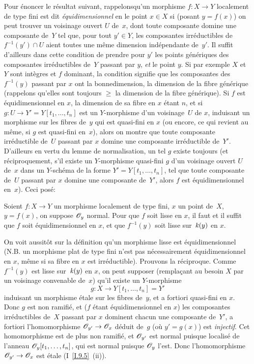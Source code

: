 Pour
\'enoncer le r\'esultat suivant, \og rappelons\fg qu'un morphisme
$f\colon X\to Y$ localement de type fini est dit
\emph{équidimensionnel}
en le point $x\in X$ si (posant $y=f(x)$) on peut trouver un voisinage
ouvert $U$ de~$x$, dont toute composante domine une composante de~$Y$
tel que, pour tout $y'\in Y$, les composantes irr\'eductibles de
$f^{-1}(y')\cap U$ aient toutes une m\^eme dimension
ind\'ependante de~$y'$. Il suffit d'ailleurs dans cette condition de
prendre pour $y'$ les points g\'en\'eriques des composantes
irr\'eductibles de~$Y$ passant par $y$, \emph{et} le point $y$. Si
par exemple $X$ et $Y$ sont int\`egres et $f$ dominant, la condition
signifie que les composantes des $f^{-1}(y)$ passant par $x$ ont \og la
bonne\fg dimension, \ie la dimension de la fibre g\'en\'erique
(rappelons qu'elles sont toujours $\ge$ la dimension de la fibre
g\'en\'erique). Si $f$ est \'equidimensionnel en $x$, la
dimension de sa fibre en $x$ \'etant $n$, et si $g\colon U\to
Y'=Y[t_{1},\dots,t_{n}]$ est un $Y$-morphisme d'un voisinage~$U$ de
$x$, induisant un morphisme sur les fibres de~$y$ qui est quasi-fini
en $x$ (ou encore, ce qui revient au m\^eme, si $g$ est quasi-fini
en~$x$), alors on montre que toute composante irr\'eductible de~$U$
passant par $x$ domine une composante irr\'eductible de~$Y'$. D'ailleurs en vertu du \og lemme de normalisation\fg, un tel $g$
existe toujours (et r\'eciproquement, s'il existe un $Y$-morphisme
quasi-fini $g$ d'un voisinage ouvert $U$ de~$x$ dans un $Y$-sch\'ema
de la forme $Y'=Y[t_{1},\dots,t_{n}]$, tel que toute composante de~$U$ passant par $x$ domine une composante de~$Y'$, alors $f$ est
\'equidimensionnel en~$x$). Ceci pos\'e:

\begin{proposition}
\label{II.2.3}
Soient $f\colon X\to Y$ un morphisme localement de type fini, $x$ un
point de~$X$, $y=f(x)$, on suppose $\cal{O}_{y}$ normal. Pour que $f$
soit lisse en $x$, il faut et il suffit que $f$ soit
\'equidimensionnel en $x$, et que $f^{-1}(y)$ soit lisse sur~$\mathit{k}(y)$
en $x$.
\end{proposition}

On voit aussit\^ot sur la d\'efinition qu'un morphisme lisse est
\'equidimensionnel (N.B. un morphisme plat de type fini n'est pas
n\'ecessairement \'equidimensionnel en $x$, m\^eme si sa fibre
en $x$ est irr\'eductible). Prouvons la r\'eciproque. Comme
$f^{-1}(y)$ est lisse sur~$\mathit{k}(y)$ en $x$, on peut supposer (rempla\c cant au besoin $X$ par un voisinage convenable de~$x$) qu'il existe
un $Y$-morphisme
$$
g\colon X\to Y[t_{1},\dots,t_{n}]=Y'
$$
induisant un morphisme \'etale sur les fibres de~$y$, et a fortiori
quasi-fini en $x$. Donc
$g$ est non ramifi\'e, et ($f$ \'etant \'equidimensionnel en
$x$) les composantes irr\'eductibles de~$X$ passant par $x$ dominent
chacun une composante de~$Y'$, a fortiori l'homomorphisme
$\cal{O}_{y'}\to\cal{O}_{x}$ d\'eduit de~$g$ (o\`u $y'=g(x)$) est
\emph{injectif}. Cet homomorphisme est de plus non ramifi\'e, et
$\cal{O}_{y'}$ est normal puisque localis\'e de l'anneau
$\cal{O}_{y}[t_{1},\dots,t_{n}]$, qui est normal puisque
$\cal{O}_{y}$ l'est. Donc l'homomorphisme $\cal{O}_{y'}\to\cal{O}_{x}$
est \'etale (I~\ref{I.9.5}~(ii)).

